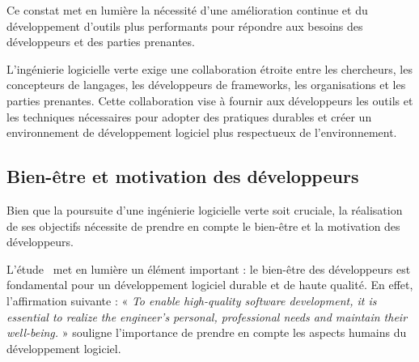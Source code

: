 Ce constat met en lumière la nécessité d'une amélioration continue et du développement d'outils plus performants pour répondre aux besoins des développeurs et des parties prenantes.


L'ingénierie logicielle verte exige une collaboration étroite entre les chercheurs, les concepteurs de langages, les développeurs de frameworks, les organisations et les parties prenantes. Cette collaboration vise à fournir aux développeurs les outils et les techniques nécessaires pour adopter des pratiques durables et créer un environnement de développement logiciel plus respectueux de l'environnement.


\subsection{Bien-être et motivation des développeurs}
Bien que la poursuite d'une ingénierie logicielle verte soit cruciale, la réalisation de ses objectifs nécessite de prendre en compte le bien-être et la motivation des développeurs.


L'étude~\cite{SustainableEngNeglectedPerspective} met en lumière un élément important : le bien-être des développeurs est fondamental pour un développement logiciel durable et de haute qualité. En effet, l'affirmation suivante : « \emph{To enable high-quality software development, it is essential to realize the engineer’s personal, professional needs and maintain their well-being.} » souligne l'importance de prendre en compte les aspects humains du développement logiciel.



